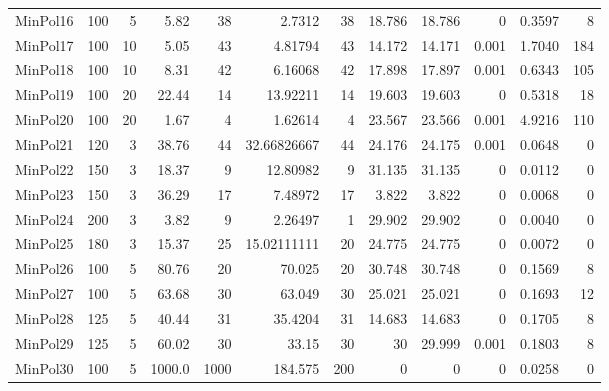 \documentclass[11pt,letterpaper]{article}
\begin{document}
\begin{landscape}
\begin{longtable}{lrrrrrrrrrrr}
MinPol16 & 100 & 5 & 5.82 & 38 & 2.7312 & 38 & 18.786 & 18.786 & 0 & 0.3597 & 8\\
MinPol17 & 100 & 10 & 5.05 & 43 & 4.81794 & 43 & 14.172 & 14.171 & 0.001 & 1.7040 & 184\\
MinPol18 & 100 & 10 & 8.31 & 42 & 6.16068 & 42 & 17.898 & 17.897 & 0.001 & 0.6343 & 105\\
MinPol19 & 100 & 20 & 22.44 & 14 & 13.92211 & 14 & 19.603 & 19.603 & 0 & 0.5318 & 18\\
MinPol20 & 100 & 20 & 1.67 & 4 & 1.62614 & 4 & 23.567 & 23.566 & 0.001 & 4.9216 & 110\\
MinPol21 & 120 & 3 & 38.76 & 44 & 32.66826667 & 44 & 24.176 & 24.175 & 0.001 & 0.0648 & 0\\
MinPol22 & 150 & 3 & 18.37 & 9 & 12.80982 & 9 & 31.135 & 31.135 & 0 & 0.0112 & 0\\
MinPol23 & 150 & 3 & 36.29 & 17 & 7.48972 & 17 & 3.822 & 3.822 & 0 & 0.0068 & 0\\
MinPol24 & 200 & 3 & 3.82 & 9 & 2.26497 & 1 & 29.902 & 29.902 & 0 & 0.0040 & 0\\
MinPol25 & 180 & 3 & 15.37 & 25 & 15.02111111 & 20 & 24.775 & 24.775 & 0 & 0.0072 & 0\\
MinPol26 & 100 & 5 & 80.76 & 20 & 70.025 & 20 & 30.748 & 30.748 & 0 & 0.1569 & 8\\
MinPol27 & 100 & 5 & 63.68 & 30 & 63.049 & 30 & 25.021 & 25.021 & 0 & 0.1693 & 12\\
MinPol28 & 125 & 5 & 40.44 & 31 & 35.4204 & 31 & 14.683 & 14.683 & 0 & 0.1705 & 8\\
MinPol29 & 125 & 5 & 60.02 & 30 & 33.15 & 30 & 30 & 29.999 & 0.001 & 0.1803 & 8\\
MinPol30 & 100 & 5 & 1000.0 & 1000 & 184.575 & 200 & 0 & 0 & 0 & 0.0258 & 0\\
\end{longtable}
\end{landscape}
\end{document}
